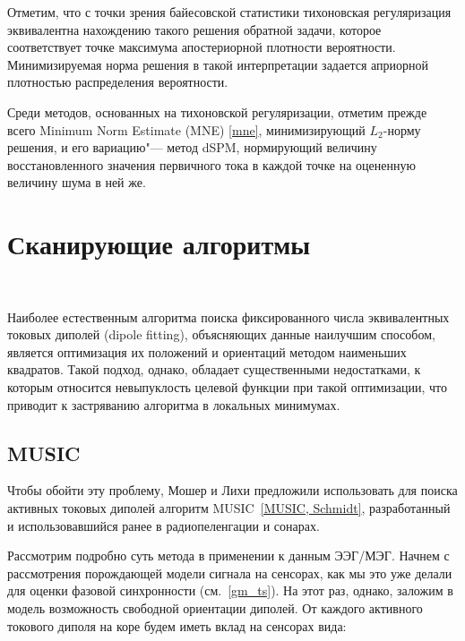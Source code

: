 Отметим, что с точки зрения байесовской статистики тихоновская регуляризация
эквивалентна нахождению такого решения обратной задачи, которое соответствует
точке максимума апостериорной плотности вероятности. Минимизируемая норма решения в такой
интерпретации задается априорной плотностью распределения вероятности.

Среди методов, основанных на тихоновской регуляризации, отметим прежде всего
Minimum Norm Estimate (MNE) \ref{mne}, минимизирующий $L_2$-норму решения,
и его вариацию"--- метод dSPM, нормирующий величину восстановленного значения первичного
тока в каждой точке на оцененную величину шума в ней же.

\section{Сканирующие алгоритмы}~\label{sect_dics}


Наиболее естественным алгоритма поиска фиксированного числа эквивалентных
токовых диполей (dipole fitting), объясняющих данные наилучшим способом,
является оптимизация их положений и ориентаций методом наименьших квадратов.
Такой подход, однако, обладает существенными недостатками, к которым относится
невыпуклость целевой функции при такой оптимизации,
что приводит к застряванию алгоритма в локальных минимумах.

\subsection{MUSIC}
Чтобы обойти эту проблему, Мошер и Лихи предложили использовать для
поиска активных токовых диполей алгоритм MUSIC~\ref{MUSIC, Schmidt}, разработанный
и использовавшийся ранее в радиопеленгации и сонарах.

Рассмотрим подробно суть метода в применении к данным ЭЭГ/МЭГ.
Начнем с рассмотрения порождающей модели сигнала на сенсорах, как мы это
уже делали для оценки фазовой синхронности (см.~\ref{gm_ts}).
На этот раз, однако, заложим в модель возможность свободной ориентации диполей.
От каждого активного токового диполя на коре будем иметь вклад на сенсорах вида:

